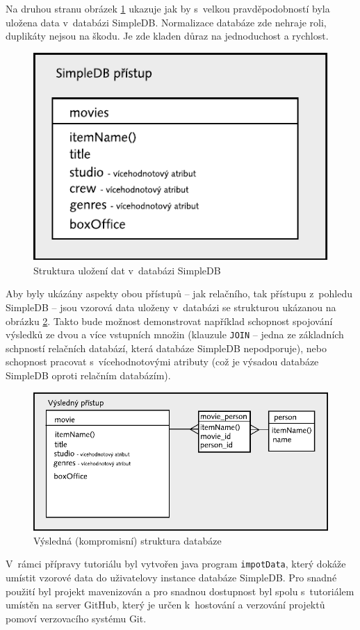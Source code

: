 \documentclass[oneside,12pt]{fithesis2}
\begin{document}
Na druhou stranu obrázek \ref{simpledbStructure} ukazuje jak by s~velkou pravděpodobností byla uložena data v~databázi SimpleDB. Normalizace databáze zde nehraje roli, duplikáty nejsou na škodu. Je zde kladen důraz na jednoduchost a rychlost.
\begin{figure}[h]
 \centering
 \includegraphics[scale=0.8]{simpledbStructure}
 \caption{Struktura uložení dat v~databázi SimpleDB}
 \label{simpledbStructure}
\end{figure}

Aby byly ukázány aspekty obou přístupů -- jak relačního, tak přístupu z~pohledu SimpleDB -- jsou vzorová data uloženy v~databázi se strukturou ukázanou na obrázku \ref{kompromisStructure}. Takto bude možnost demonstrovat například schopnost spojování výsledků ze dvou a více vstupních množin (klauzule \texttt{JOIN} -- jedna ze základních schpností relačních databází, která databáze SimpleDB nepodporuje), nebo schopnost pracovat s~vícehodnotovými atributy (což je výsadou databáze SimpleDB oproti relačním databázím).

\begin{figure}[h]
 \centering
 \includegraphics[scale=0.8]{kompromisStructure}
 \caption{Výsledná (kompromisní) struktura databáze}
 \label{kompromisStructure}
\end{figure}
\vspace{30mm}
V~rámci přípravy tutoriálu byl vytvořen java program \texttt{impotData}, který dokáže umístit vzorové data do uživatelovy instance databáze SimpleDB. Pro snadné použití byl projekt mavenizován a pro snadnou dostupnost byl spolu s~tutoriálem umístěn na server GitHub, který je určen k~hostování a verzování projektů pomoví verzovacího systému Git.
\end{document}
